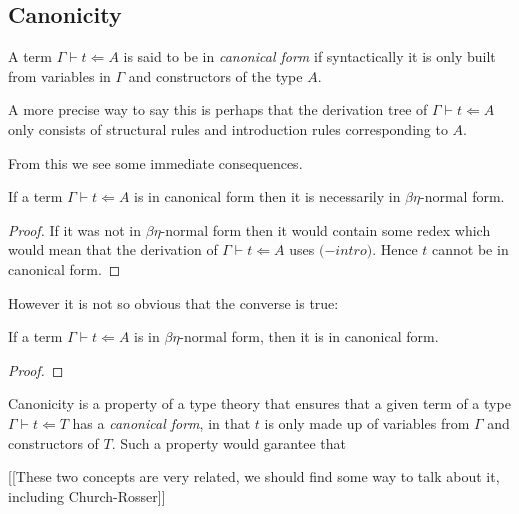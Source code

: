 \subsection{Canonicity}

\begin{defin}
    A term $\Gamma \vdash t \Leftarrow A$ is said to be in \emph{canonical form} if syntactically it is only built from variables in $\Gamma$ and constructors of the type $A$.
\end{defin}

\begin{remark}
    A more precise way to say this is perhaps that the derivation tree of $\Gamma \vdash t \Leftarrow A$ only consists of structural rules and introduction rules corresponding to $A$.
\end{remark}

From this we see some immediate consequences.

\begin{lemma}
    If a term $\Gamma \vdash t \Leftarrow A$ is in canonical form then it is necessarily in $\beta \eta$-normal form.
\end{lemma}

\begin{proof}
    If it was not in $\beta \eta$-normal form then it would contain some redex which would mean that the derivation of $\Gamma \vdash t \Leftarrow A$ uses $($\to$-intro)$. Hence $t$ cannot be in canonical form.
\end{proof}

However it is not so obvious that the converse is true:

\begin{lemma}
    If a term $\Gamma \vdash t \Leftarrow A$ is in $\beta \eta$-normal form, then it is in canonical form.
\end{lemma}

\begin{proof}
    
\end{proof}










Canonicity is a property of a type theory that ensures that a given term of a type $\Gamma \vdash t \Leftarrow T$ has a \emph{canonical form}, in that $t$ is only made up of variables from $\Gamma$ and constructors of $T$. Such a property would garantee that 

[[These two concepts are very related, we should find some way to talk about it, including Church-Rosser]]
